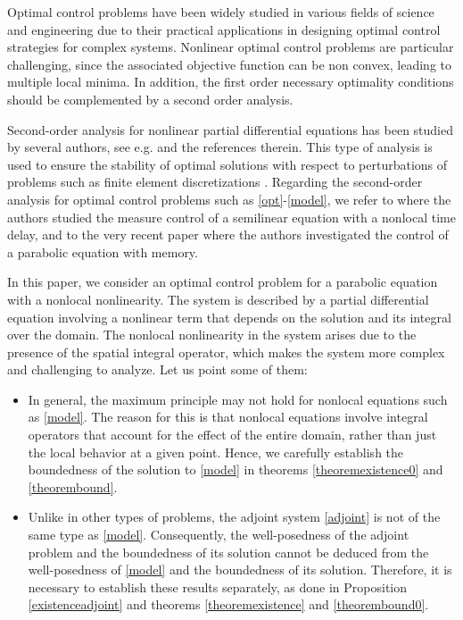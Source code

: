 \documentclass[reqno,twoside]{amsart}
\numberwithin{equation}{section}
\theoremstyle{definition}
\numberwithin{equation}{section}
\begin{document}
Optimal control problems have been widely studied in various fields of science \cite{anita2000,anicta2011, lenhart2007} and engineering \cite{ben2010optimal, geering2007, yang1975} due to their practical applications in designing optimal control strategies for complex systems. Nonlinear optimal control problems are particular challenging, since the associated objective function can be non convex, leading to multiple local minima. In addition, the first order necessary optimality conditions should be complemented by a second order analysis. 

Second-order analysis for nonlinear partial differential equations has been studied by several authors, see e.g. \cite{antil2020op,bayen2014, bonifacius2018,casas2018analysis, casas2020, casas2012, casas2016second,hoppe2022} and the references therein. This type of analysis is used to ensure the stability of optimal solutions with respect to perturbations of problems such as finite element discretizations \cite{casas2015a}. Regarding the second-order analysis for optimal control problems such as \eqref{opt}-\eqref{model}, we refer to \cite{casas2018} where the authors studied the measure control of a semilinear equation with a nonlocal time delay, and to the very recent paper \cite{casas2023} where the authors investigated the control of a parabolic equation with memory.

In this paper, we consider an optimal control problem for a parabolic equation with a nonlocal nonlinearity. The system is described by a partial differential equation involving a nonlinear term that depends on the solution and its integral over the domain. The nonlocal nonlinearity in the system arises due to the presence of the spatial integral operator, which makes the system more complex and challenging to analyze. Let us point some of them:
\begin{itemize}
	\item In general, the maximum principle may not hold for nonlocal equations such as \eqref{model}. The reason for this is that nonlocal equations involve integral operators that account for the effect of the entire domain, rather than just the local behavior at a given point. Hence, we carefully establish the boundedness of the solution to \eqref{model} in theorems \ref{theoremexistence0} and \ref{theorembound}.
	\item Unlike in other types of problems, the adjoint system \eqref{adjoint} is not of the same type as \eqref{model}. Consequently, the well-posedness of the adjoint problem and the boundedness of its solution cannot be deduced from the well-posedness of \eqref{model} and the boundedness of its solution. Therefore, it is necessary to establish these results separately, as done in Proposition \ref{existenceadjoint} and theorems \ref{theoremexistence} and \ref{theorembound0}.
\end{itemize}
\end{document}
